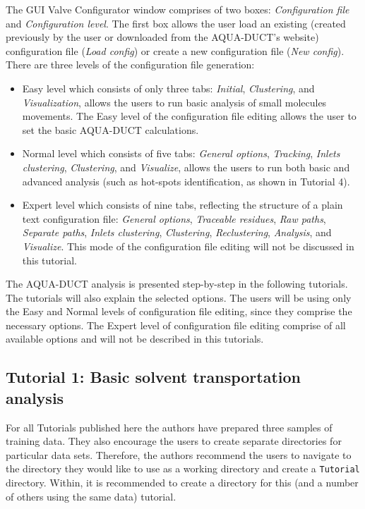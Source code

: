 \documentclass[9pt,tutorial]{livecoms}
\begin{document}
The GUI Valve Configurator window comprises of two boxes: \textit{Configuration file} and \textit{Configuration level}. The first box allows the user load an existing (created previously by the user or downloaded from the AQUA-DUCT's website) configuration file (\textit{Load config}) or create a new configuration file (\textit{New config}). There are three levels of the configuration file generation:
\begin{itemize}
\item{Easy level} which consists of only three tabs: \textit{Initial}, \textit{Clustering}, and \textit{Visualization}, allows the users to run basic analysis of small molecules movements. The Easy level of the configuration file editing allows the user to set the basic AQUA-DUCT calculations.
\item{Normal level} which consists of five tabs: \textit{General options}, \textit{Tracking}, \textit{Inlets clustering}, \textit{Clustering}, and \textit{Visualize}, allows the users to run both basic and advanced analysis (such as hot-spots identification, as shown in Tutorial 4).
\item{Expert level} which consists of nine tabs, reflecting the structure of a plain text configuration file: \textit{General options}, \textit{Traceable residues}, \textit{Raw paths}, \textit{Separate paths}, \textit{Inlets clustering}, \textit{Clustering}, \textit{Reclustering}, \textit{Analysis}, and \textit{Visualize}. This mode of the configuration file editing will not be discussed in this tutorial.
\end{itemize}

The AQUA-DUCT analysis is presented step-by-step in the following tutorials. The tutorials will also explain the selected options. The users will be using only the Easy and Normal levels of configuration file editing, since they comprise the necessary options. The Expert level of configuration file editing comprise of all available options and will not be described in this tutorials.

\subsection{Tutorial 1: Basic solvent transportation analysis}
For all Tutorials published here the authors have prepared three samples of training data. They also encourage the users to create 
separate directories for particular data sets. Therefore, the authors recommend the users to navigate to the directory they would like to use as a working directory and create a \texttt{Tutorial} directory. Within, it is recommended to create a directory for this (and a number of others using the same data) tutorial. 
\end{document}
